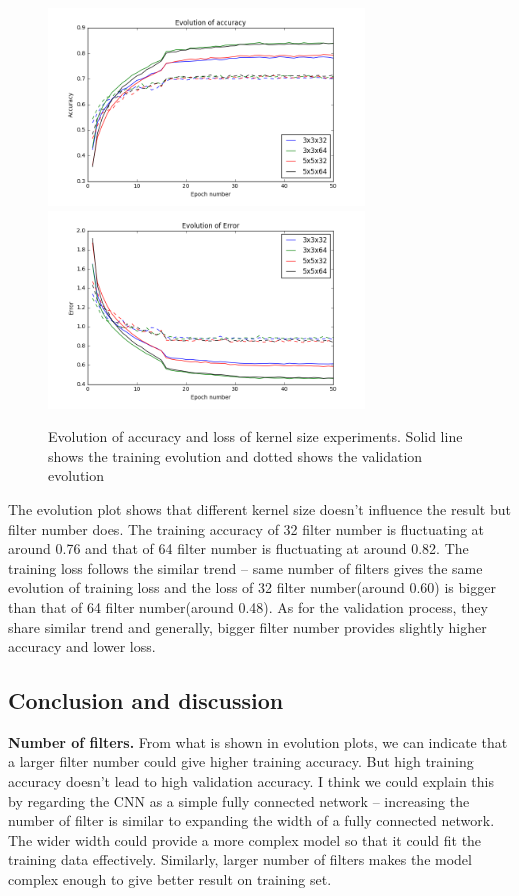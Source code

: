 \documentclass[]{article}
\begin{document}
\begin{figure}[!ht]
\begin{center}
\includegraphics[width = 3.3in]{kernel_size_acc}
\includegraphics[width = 3.3in]{kernel_size_err}
\caption{Evolution of accuracy and loss of kernel size experiments. Solid line shows the training evolution and dotted shows the validation evolution}
\end{center}
\end{figure}

The evolution plot shows that different kernel size doesn't influence the result but filter number does. The training accuracy of 32 filter number is fluctuating at around 0.76 and that of 64 filter number is fluctuating at around 0.82. The training loss follows the similar trend -- same number of filters gives the same evolution of training loss and the loss of 32 filter number(around 0.60) is bigger than that of 64 filter number(around 0.48). As for the validation process, they share similar trend and generally, bigger filter number provides slightly higher accuracy and lower loss. 

\subsection{Conclusion and discussion}

\textbf{Number of filters.} From what is shown in evolution plots, we can indicate that a larger filter number could give higher training accuracy. But high training accuracy doesn't lead to high validation accuracy. I think we could explain this by regarding the CNN as a simple fully connected network -- increasing the number of filter is similar to expanding the width of a fully connected network. The wider width could provide a more complex model so that it could fit the training data effectively. Similarly, larger number of filters makes the model complex enough to give better result on training set. 
\end{document}
